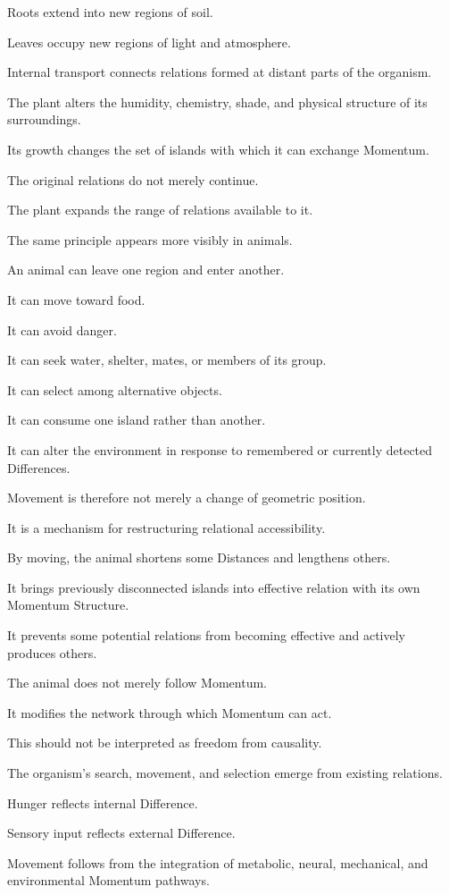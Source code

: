 Roots extend into new regions of soil.

Leaves occupy new regions of light and atmosphere.

Internal transport connects relations formed at distant parts of the organism.

The plant alters the humidity, chemistry, shade, and physical structure of its surroundings.

Its growth changes the set of islands with which it can exchange Momentum.

The original relations do not merely continue.

The plant expands the range of relations available to it.

The same principle appears more visibly in animals.

An animal can leave one region and enter another.

It can move toward food.

It can avoid danger.

It can seek water, shelter, mates, or members of its group.

It can select among alternative objects.

It can consume one island rather than another.

It can alter the environment in response to remembered or currently detected Differences.

Movement is therefore not merely a change of geometric position.

It is a mechanism for restructuring relational accessibility.

By moving, the animal shortens some Distances and lengthens others.

It brings previously disconnected islands into effective relation with its own Momentum Structure.

It prevents some potential relations from becoming effective and actively produces others.

The animal does not merely follow Momentum.

It modifies the network through which Momentum can act.

This should not be interpreted as freedom from causality.

The organism’s search, movement, and selection emerge from existing relations.

Hunger reflects internal Difference.

Sensory input reflects external Difference.

Movement follows from the integration of metabolic, neural, mechanical, and environmental Momentum pathways.

